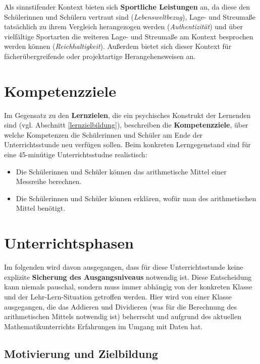 \documentclass[
]{scrbook}
\providecommand{\tightlist}{%
  \setlength{\itemsep}{0pt}\setlength{\parskip}{0pt}}
\theoremstyle{definition}
\theoremstyle{definition}
\theoremstyle{definition}
\theoremstyle{definition}
\theoremstyle{remark}
\begin{document}
Als sinnstifender Kontext bieten sich \textbf{Sportliche Leistungen} an, da diese den Schülerinnen und Schülern vertraut sind (\emph{Lebensweltbezug}), Lage- und Streumaße tatsächlich zu ihrem Vergleich herangezogen werden (\emph{Authentizität}) und über vielfältige Sportarten die weiteren Lage- und Streumaße am Kontext besprochen werden können (\emph{Reichhaltigkeit}). Außerdem bietet sich dieser Kontext für fächerübergreifende oder projektartige Herangehensweisen an.

\section{Kompetenzziele}\label{kompetenzziele}

Im Gegensatz zu den \textbf{Lernzielen}, die ein psychisches Konstrukt der Lernenden sind (vgl. Abschnitt \ref{lernzielbildung}), beschreiben die \textbf{Kompetenzziele}, über welche Kompetenzen die Schülerinnen und Schüler am Ende der Unterrichtsstunde neu verfügen sollen. Beim konkreten Lerngegenstand sind für eine 45-minütige Unterrichtsstudne realistisch:

\begin{itemize}
\tightlist
\item
  Die Schülerinnen und Schüler können das arithmetische Mittel einer Messreihe berechnen.\\
\item
  Die Schülerinnen und Schüler können erklären, wofür man des arithmetischen Mittel benötigt.
\end{itemize}

\section{Unterrichtsphasen}\label{unterrichtsphasen}

Im folgenden wird davon ausgegangen, dass für diese Unterrichtsstunde keine explizite \textbf{Sicherung des Ausgangsniveaus} notwendig ist. Diese Entscheidung kann niemals pauschal, sondern muss immer abhängig von der konkreten Klasse und der Lehr-Lern-Situation getroffen werden. Hier wird von einer Klasse ausgegangen, die das Addieren und Dividieren (was für die Berechnung des arithmetischen Mittels notwendig ist) beherrscht und aufgrund des aktuellen Mathematikunterrichts Erfahrungen im Umgang mit Daten hat.

\subsection{Motivierung und Zielbildung}\label{motivierung-und-zielbildung-1}
\end{document}
